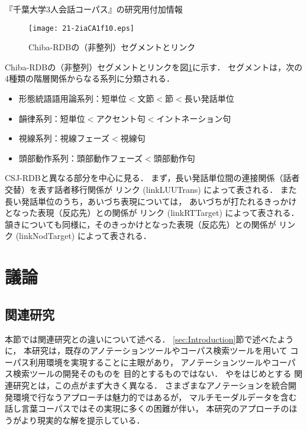 \documentclass[japanese]{jnlp_1.4}
\begin{document}
\begin{table}[b]
\caption{『千葉大学3人会話コーパス』の研究用付加情報}
\label{tab:chibaAnno}

\end{table}

\begin{figure}[b]
\begin{center}
\texttt{[image: 21-2iaCA1f10.eps]}
\end{center}
\caption{Chiba-RDBの（非整列）セグメントとリンク}
\label{fig:chibaRdb}
\end{figure}

Chiba-RDBの（非整列）セグメントとリンクを図\ref{fig:chibaRdb}に示す．
セグメントは，次の4種類の階層関係からなる系列に分類される．

\begin{itemize}
 \item 形態統語語用論系列：短単位$<$文節$<$節$<$長い発話単位
 \item 韻律系列：短単位$<$アクセント句$<$イントネーション句
 \item 視線系列：視線フェーズ$<$視線句
 \item 頭部動作系列：頭部動作フェーズ$<$頭部動作句
\end{itemize}

CSJ-RDBと異なる部分を中心に見る．
まず，長い発話単位間の連接関係（話者交替）を表す話者移行関係が
リンク (linkLUUTrans) によって表される．
また長い発話単位のうち，あいづち表現については，
あいづちが打たれるきっかけとなった表現（反応先）との関係が
リンク (linkRTTarget) によって表される．
頷きについても同様に，そのきっかけとなった表現（反応先）との関係が
リンク (linkNodTarget) によって表される．


\section{議論}
\label{sec:Discussion}


\subsection{関連研究}
\label{sec:Discussion:RelatedResearch}

本節では関連研究との違いについて述べる．
\ref{sec:Introduction}節で述べたように，
本研究は，既存のアノテーションツールやコーパス検索ツールを用いて
コーパス利用環境を実現することに主眼があり，
アノテーションツールやコーパス検索ツールの開発そのものを
目的とするものではない．
やをはじめとする
関連研究とは，この点がまず大きく異なる．
さまざまなアノテーションを統合開発環境で行なうアプローチは魅力的ではあるが，
マルチモーダルデータを含む話し言葉コーパスではその実現に多くの困難が伴い，
本研究のアプローチのほうがより現実的な解を提示している．
\end{document}
